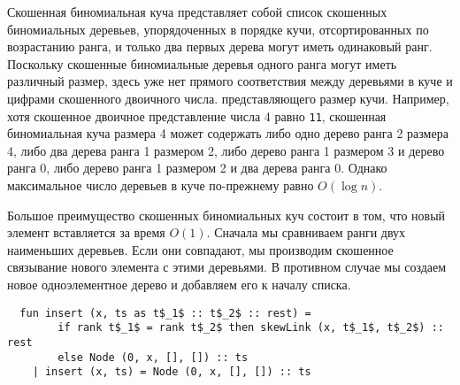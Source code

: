 Скошенная биномиальная куча представляет собой список скошенных
биномиальных деревьев, упорядоченных в порядке кучи, отсортированных
по возрастанию ранга, и только два первых дерева могут иметь
одинаковый ранг. Поскольку скошенные биномиальные деревья одного ранга
могут иметь различный размер, здесь уже нет прямого соответствия между
деревьями в куче и цифрами скошенного двоичного числа. представляющего
размер кучи.  Например, хотя скошенное двоичное представление числа 4
равно \texttt{11}, скошенная биномиальная куча размера 4 может
содержать либо одно дерево ранга 2 размера 4, либо два дерева ранга 1
размером 2, либо дерево ранга 1 размером 3 и дерево ранга 0, либо
дерево ранга 1 размером 2 и два дерева ранга 0. Однако максимальное
число деревьев в куче по-прежнему равно $O(\log n)$.

Большое преимущество скошенных биномиальных куч состоит в том, что
новый элемент вставляется за время $O(1)$. Сначала мы сравниваем ранги
двух наименьших деревьев. Если они совпадают, мы производим скошенное
связывание нового элемента с этими деревьями. В противном случае мы
создаем новое одноэлементное дерево и добавляем его к началу списка.
\begin{lstlisting}
  fun insert (x, ts as t$_1$ :: t$_2$ :: rest) =
        if rank t$_1$ = rank t$_2$ then skewLink (x, t$_1$, t$_2$) :: rest
        else Node (0, x, [], []) :: ts
    | insert (x, ts) = Node (0, x, [], []) :: ts
\end{lstlisting}

